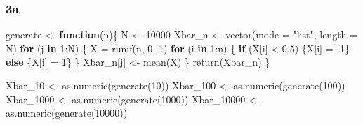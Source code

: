 \documentclass[
]{article}
\newenvironment{Shaded}{\begin{snugshade}}{\end{snugshade}}
\newcommand{\AttributeTok}[1]{\textcolor[rgb]{0.77,0.63,0.00}{#1}}
\newcommand{\ControlFlowTok}[1]{\textcolor[rgb]{0.13,0.29,0.53}{\textbf{#1}}}
\newcommand{\DecValTok}[1]{\textcolor[rgb]{0.00,0.00,0.81}{#1}}
\newcommand{\FloatTok}[1]{\textcolor[rgb]{0.00,0.00,0.81}{#1}}
\newcommand{\FunctionTok}[1]{\textcolor[rgb]{0.00,0.00,0.00}{#1}}
\newcommand{\NormalTok}[1]{#1}
\newcommand{\OtherTok}[1]{\textcolor[rgb]{0.56,0.35,0.01}{#1}}
\newcommand{\SpecialCharTok}[1]{\textcolor[rgb]{0.00,0.00,0.00}{#1}}
\newcommand{\StringTok}[1]{\textcolor[rgb]{0.31,0.60,0.02}{#1}}
\begin{document}
\hypertarget{a-1}{%
\subsubsection{3a}\label{a-1}}

\begin{Shaded}
\begin{Highlighting}[]
\NormalTok{generate }\OtherTok{\textless{}{-}} \ControlFlowTok{function}\NormalTok{(n)\{}
\NormalTok{  N }\OtherTok{\textless{}{-}} \DecValTok{10000}
\NormalTok{  Xbar\_n }\OtherTok{\textless{}{-}} \FunctionTok{vector}\NormalTok{(}\AttributeTok{mode =} \StringTok{"list"}\NormalTok{, }\AttributeTok{length =}\NormalTok{ N)}
  \ControlFlowTok{for}\NormalTok{ (j }\ControlFlowTok{in} \DecValTok{1}\SpecialCharTok{:}\NormalTok{N) \{}
\NormalTok{    X }\OtherTok{=} \FunctionTok{runif}\NormalTok{(n, }\DecValTok{0}\NormalTok{, }\DecValTok{1}\NormalTok{)}
    \ControlFlowTok{for}\NormalTok{ (i }\ControlFlowTok{in} \DecValTok{1}\SpecialCharTok{:}\NormalTok{n) \{}
      \ControlFlowTok{if}\NormalTok{ (X[i] }\SpecialCharTok{\textless{}} \FloatTok{0.5}\NormalTok{) \{X[i] }\OtherTok{=} \SpecialCharTok{{-}}\DecValTok{1}\NormalTok{\}}
      \ControlFlowTok{else}\NormalTok{ \{X[i] }\OtherTok{=} \DecValTok{1}\NormalTok{\}}
\NormalTok{    \}}
\NormalTok{  Xbar\_n[j] }\OtherTok{\textless{}{-}} \FunctionTok{mean}\NormalTok{(X)}
\NormalTok{  \}}
\FunctionTok{return}\NormalTok{(Xbar\_n)}
\NormalTok{\}}

\NormalTok{Xbar\_10 }\OtherTok{\textless{}{-}} \FunctionTok{as.numeric}\NormalTok{(}\FunctionTok{generate}\NormalTok{(}\DecValTok{10}\NormalTok{))}
\NormalTok{Xbar\_100 }\OtherTok{\textless{}{-}} \FunctionTok{as.numeric}\NormalTok{(}\FunctionTok{generate}\NormalTok{(}\DecValTok{100}\NormalTok{))}
\NormalTok{Xbar\_1000 }\OtherTok{\textless{}{-}} \FunctionTok{as.numeric}\NormalTok{(}\FunctionTok{generate}\NormalTok{(}\DecValTok{1000}\NormalTok{))}
\NormalTok{Xbar\_10000 }\OtherTok{\textless{}{-}} \FunctionTok{as.numeric}\NormalTok{(}\FunctionTok{generate}\NormalTok{(}\DecValTok{10000}\NormalTok{))}


\end{Highlighting}
\end{Shaded}
\end{document}
